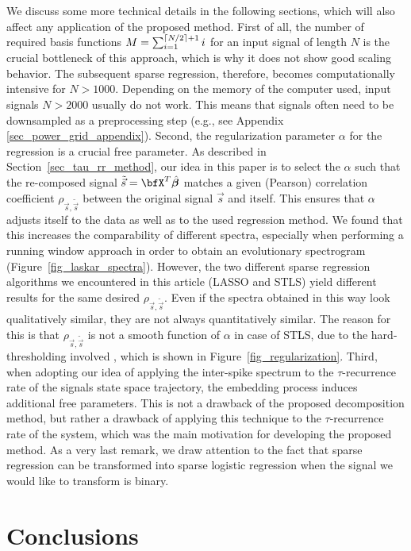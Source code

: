 \documentclass[entropy,article,accept,pdftex,moreauthors]{Definitions/mdpi}
\DeclarePairedDelimiter\ceil{\lceil}{\rceil}
\begin{document}
We discuss some more technical details in the following sections, which will also affect any application of the proposed method. 
First of all, the number of required basis functions 
$M = \sum_{i=1}^{\ceil*{N/2}+1}i$ for an input signal of length $N$ is the crucial bottleneck of this approach, which is why it does not show good scaling behavior. The subsequent sparse 
regression, therefore, becomes computationally intensive for $N>1000$. Depending on the memory of the computer used, input signals $N>2000$ usually do not work. This means that signals 
often need to be downsampled as a preprocessing step (e.g., see Appendix \ref{sec_power_grid_appendix}). Second, the regularization parameter $\alpha$ for the regression is a crucial free parameter. 
As described in Section~\ref{sec_tau_rr_method}, our idea in this paper is to select the $\alpha$ such that the re-composed signal $\tilde{\vec{s}}=\bfX^T\hat{\boldsymbol\beta}$ matches a 
given (Pearson) correlation coefficient $\rho_{\vec{s},\tilde{\vec{s}}}$ between the original signal $\vec{s}$ and itself. This ensures that $\alpha$ adjusts itself to the data as well as to the 
used regression method. We found that this increases the comparability of different spectra, especially when performing a running window approach in order to obtain an evolutionary spectrogram 
(Figure~\ref{fig_laskar_spectra}). 
However, the two different sparse regression algorithms we encountered in this article (LASSO and STLS) yield different results for the same desired $\rho_{\vec{s},\tilde{\vec{s}}}$. 
Even if the spectra obtained in this way look qualitatively similar, they are not always quantitatively similar. The reason for this 
is that $\rho_{\vec{s},\tilde{\vec{s}}}$ is not a smooth function of $\alpha$ in case of STLS, due to the hard-thresholding involved \cite{Brunton2016}, which is shown in Figure~\ref{fig_regularization}.
Third, when adopting our idea of applying the inter-spike spectrum to the $\tau$-recurrence rate of the signals state space trajectory, the embedding process induces additional free parameters.  
This is not a drawback of the proposed decomposition method, but rather a drawback of applying this technique to the $\tau$-recurrence rate of the system, which was the main motivation for 
developing the proposed method. As a very last remark, we draw attention to the fact that sparse regression can be transformed into sparse logistic regression when the signal we would like to transform is binary.


\section{Conclusions}\label{sec_tau_rr_conclusion}
\end{document}
